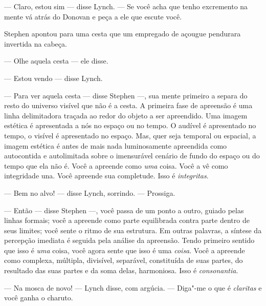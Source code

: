  --- Claro, estou sim --- disse Lynch. --- Se você acha que tenho excremento na
mente vá atrás do Donovan e peça a ele que escute você.

Stephen apontou para uma cesta que um empregado de açougue pendurara
invertida na cabeça.

 --- Olhe aquela cesta --- ele disse.

 --- Estou vendo --- disse Lynch.

 --- Para ver aquela cesta --- disse Stephen ---, sua mente primeiro a separa do
resto do universo visível que não é a cesta. A primeira fase de
apreensão é uma linha delimitadora traçada ao redor do objeto a ser
apreendido. Uma imagem estética é apresentada a nós no espaço ou no
tempo. O audível é apresentado no tempo, o visível é apresentado no
espaço. Mas, quer seja temporal ou espacial, a imagem estética é antes
de mais nada luminosamente apreendida como autocontida e autolimitada
sobre o imensurável cenário de fundo do espaço ou do tempo que ela não
é. Você a apreende como \textit{uma} coisa. Você a vê como integridade
una. Você apreende sua completude. Isso é \textit{integritas}.

 --- Bem no alvo! --- disse Lynch, sorrindo. --- Prossiga.

 --- Então --- disse Stephen ---, você passa de um ponto a outro, guiado pelas
linhas formais; você a apreende como parte equilibrada contra parte
dentro de seus limites; você sente o ritmo de sua estrutura. Em outras
palavras, a síntese da percepção imediata é seguida pela análise da
apreensão. Tendo primeiro sentido que isso é \textit{uma} coisa, você
agora sente que isso é uma \textit{coisa}. Você a apreende como
complexa, múltipla, divisível, separável, constituída de suas partes,
do resultado das suas partes e da soma delas, harmoniosa. Isso é
\textit{consonantia}.

 --- Na mosca de novo! --- Lynch disse, com argúcia. --- Diga"-me o que é
\textit{claritas} e você ganha o charuto.

